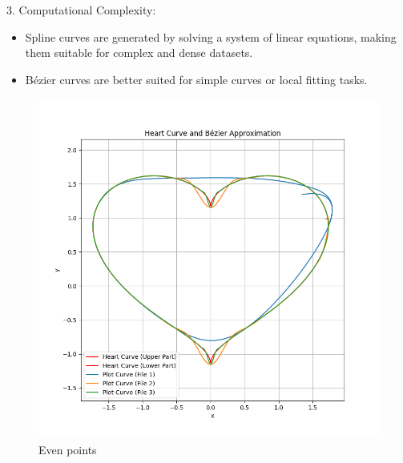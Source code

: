 \documentclass[a4paper]{article}
\begin{document}
3. Computational Complexity:
\begin{itemize}
    \item Spline curves are generated by solving a system of linear equations, making them suitable for complex and dense datasets.
    \item Bézier curves are better suited for simple curves or local fitting tasks.
\end{itemize}

\begin{figure}[h]
    \centering
    \begin{minipage}{0.45\textwidth}
        \centering
        \includegraphics[width=\linewidth]{../figure/E_even.png}
        \caption{Even points}
    \end{minipage}%
    \hfill
    \begin{minipage}{0.45\textwidth}
        \centering

\end{minipage}
\end{figure}
\end{document}
